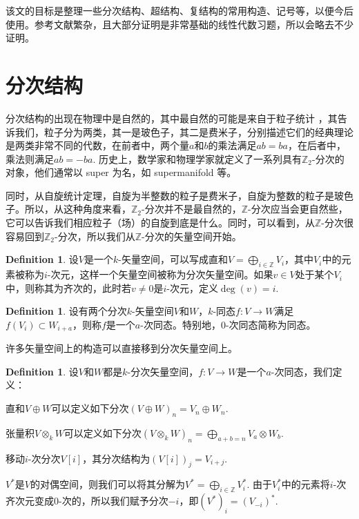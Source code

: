 \documentclass[11pt]{article}
\theoremstyle{definition}
\newtheorem{defi}[para]{Definition}
\theoremstyle{plain}
\begin{document}
    
该文的目标是整理一些分次结构、超结构、复结构的常用构造、记号等，以便今后使用。参考文献繁杂，且大部分证明是非常基础的线性代数习题，所以会略去不少证明。

\section{分次结构}

分次结构的出现在物理中是自然的，其中最自然的可能是来自于粒子统计%
，其告诉我们，粒子分为两类，其一是玻色子，其二是费米子，分别描述它们的经典理论是两类非常不同的代数，在前者中，两个量$a$和$b$的乘法满足$ab=ba$，在后者中，乘法则满足$ab=-ba$. 历史上，数学家和物理学家就定义了一系列具有$\mathbb{Z}_2$-分次的对象，他们通常以 super 为名，如 supermanifold 等。

同时，从自旋统计定理，自旋为半整数的粒子是费米子，自旋为整数的粒子是玻色子。所以，从这种角度来看，$\mathbb{Z}_2$-分次并不是最自然的，$\mathbb{Z}$-分次应当会更自然些，它可以告诉我们相应粒子（场）的自旋到底是什么。同时，可以看到，从$\mathbb Z$-分次很容易回到$\mathbb Z_2$-分次，所以我们从$\mathbb{Z}$-分次的矢量空间开始。

\begin{defi}
    设$V$是一个$k$-矢量空间，可以写成直和$V=\bigoplus_{i\in\mathbb Z} V_i$，其中$V_i$中的元素被称为$i$-次元，这样一个矢量空间被称为分次矢量空间。如果$v\in V$处于某个$V_i$中，则称其为齐次的，此时若$v\neq 0$是$i$-次元，定义$\deg(v)=i$. 
\end{defi}

\begin{defi}
    设有两个分次$k$-矢量空间$V$和$W$，$k$-同态$f:V\to W$满足$f(V_i)\subset W_{i+a}$，则称$f$是一个$a$-次同态。特别地，$0$-次同态简称为同态。
\end{defi}

许多矢量空间上的构造可以直接移到分次矢量空间上。

\begin{defi}设$V$和$W$都是$k$-分次矢量空间，$f:V\to W$是一个$a$-次同态，我们定义：
    \begin{compactenum}[\quad (1)]
        \item 直和$V\oplus W$可以定义如下分次$(V\oplus W)_n=V_n\oplus W_n$.
        \item 张量积$V\otimes_k W$可以定义如下分次$(V\otimes_k W)_n=\bigoplus_{a+b=n}V_a\otimes W_b$.
        \item 移动$i$-次分次$V[i]$，其分次结构为$(V[i])_{j}=V_{i+j}$.
        \item $V^*$是$V$的对偶空间，则我们可以将其分解为$V^*=\bigoplus_{i\in\mathbb Z}V_i^*$. 由于$V_i^*$中的元素将$i$-次齐次元变成$0$-次的，所以我们赋予分次$-i$，即$(V^*)_i=(V_{-i})^*$.
    \end{compactenum}
\end{defi}
\end{document}
